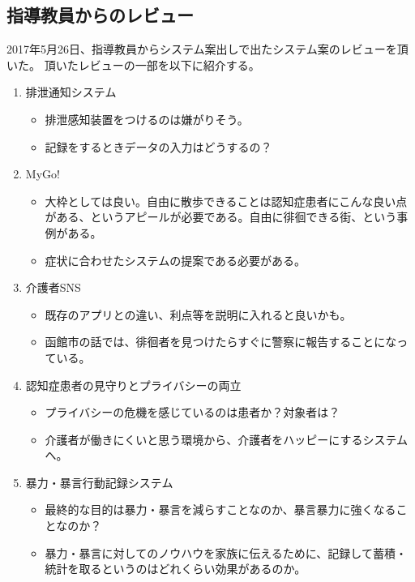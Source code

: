 \documentclass[../report]{subfiles}
\begin{document}
\subsection{指導教員からのレビュー}
2017年5月26日、指導教員からシステム案出しで出たシステム案のレビューを頂いた。
頂いたレビューの一部を以下に紹介する。
\begin{enumerate}
    \item 排泄通知システム
        \begin{itemize}
            \item 排泄感知装置をつけるのは嫌がりそう。
            \item 記録をするときデータの入力はどうするの？
        \end{itemize}
    \item MyGo!
        \begin{itemize}
            \item 大枠としては良い。自由に散歩できることは認知症患者にこんな良い点がある、というアピールが必要である。自由に徘徊できる街、という事例がある\cite{haikai}。
            \item 症状に合わせたシステムの提案である必要がある。
        \end{itemize}
    \item 介護者SNS
        \begin{itemize}
            \item 既存のアプリとの違い、利点等を説明に入れると良いかも。
            \item 函館市の話では、徘徊者を見つけたらすぐに警察に報告することになっている。
        \end{itemize}
    \item 認知症患者の見守りとプライバシーの両立
        \begin{itemize}
            \item プライバシーの危機を感じているのは患者か？対象者は？
            \item 介護者が働きにくいと思う環境から、介護者をハッピーにするシステムへ。
        \end{itemize}
    \item 暴力・暴言行動記録システム
        \begin{itemize}
            \item 最終的な目的は暴力・暴言を減らすことなのか、暴言暴力に強くなることなのか？
            \item 暴力・暴言に対してのノウハウを家族に伝えるために、記録して蓄積・統計を取るというのはどれくらい効果があるのか。
        \end{itemize}
\end{enumerate}
\end{document}
